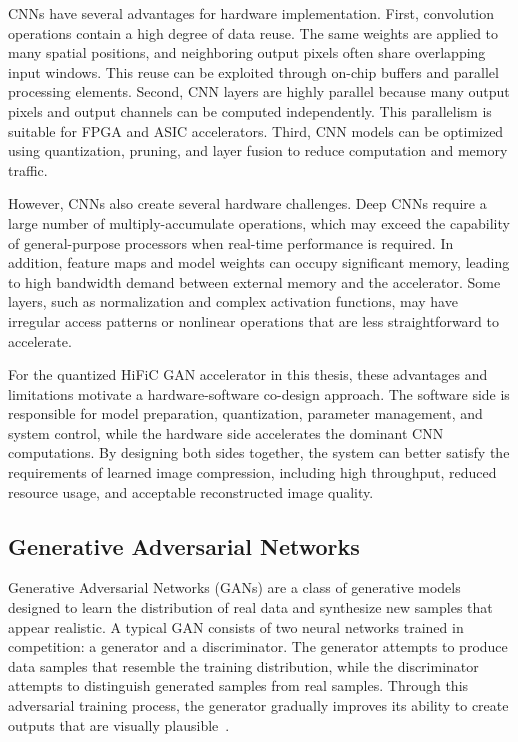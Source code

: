 CNNs have several advantages for hardware implementation. First, convolution operations contain a high degree of data reuse. The same weights are applied to many spatial positions, and neighboring output pixels often share overlapping input windows. This reuse can be exploited through on-chip buffers and parallel processing elements. Second, CNN layers are highly parallel because many output pixels and output channels can be computed independently. This parallelism is suitable for FPGA and ASIC accelerators. Third, CNN models can be optimized using quantization, pruning, and layer fusion to reduce computation and memory traffic.

However, CNNs also create several hardware challenges. Deep CNNs require a large number of multiply-accumulate operations, which may exceed the capability of general-purpose processors when real-time performance is required. In addition, feature maps and model weights can occupy significant memory, leading to high bandwidth demand between external memory and the accelerator. Some layers, such as normalization and complex activation functions, may have irregular access patterns or nonlinear operations that are less straightforward to accelerate.

For the quantized HiFiC GAN accelerator in this thesis, these advantages and limitations motivate a hardware-software co-design approach. The software side is responsible for model preparation, quantization, parameter management, and system control, while the hardware side accelerates the dominant CNN computations. By designing both sides together, the system can better satisfy the requirements of learned image compression, including high throughput, reduced resource usage, and acceptable reconstructed image quality.

\subsection{Generative Adversarial Networks}

Generative Adversarial Networks (GANs) are a class of generative models designed to learn the distribution of real data and synthesize new samples that appear realistic. A typical GAN consists of two neural networks trained in competition: a generator and a discriminator. The generator attempts to produce data samples that resemble the training distribution, while the discriminator attempts to distinguish generated samples from real samples. Through this adversarial training process, the generator gradually improves its ability to create outputs that are visually plausible~\cite{goodfellow2014gan}.

